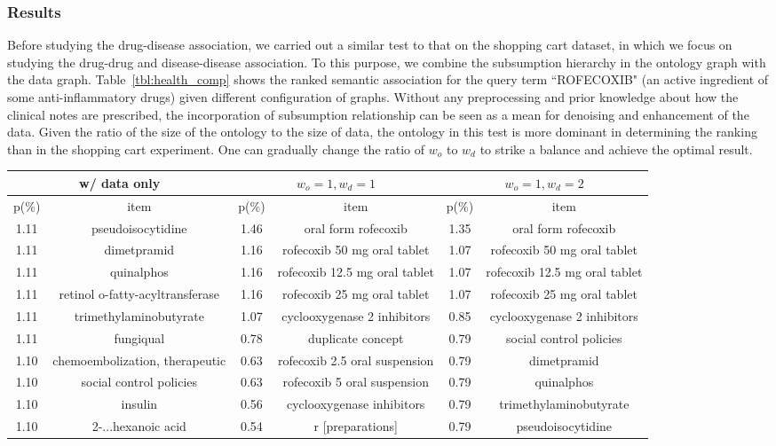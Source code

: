 \subsubsection{Results}
Before studying the drug-disease association, we carried out a similar test to that on the shopping cart dataset, in which we focus on studying the drug-drug and disease-disease association. To this purpose, we combine the subsumption hierarchy in the ontology graph with the data graph. Table~\ref{tbl:health_comp} shows the ranked semantic association for the query term ``ROFECOXIB" (an active ingredient of some anti-inflammatory drugs) given different configuration of graphs. Without any preprocessing and prior knowledge about how the clinical notes are prescribed, the incorporation of subsumption relationship can be seen as a mean for denoising and enhancement of the data. Given the ratio of the size of the ontology to the size of data, the ontology in this test is more dominant in determining the ranking than in the shopping cart experiment. One can gradually change the ratio of $w_o$ to $w_d$ to strike a balance and achieve the optimal result.
\begin{table*}[tbh]\scriptsize
\begin{center}
\begin{tabular}{ c  c || c  c || c  c  }
\hline
\multicolumn{2}{c||}{w/ data only}			&	\multicolumn{2}{c||}{$w_o=1, w_d=1$}			&	\multicolumn{2}{c}{$w_o=1, w_d=2$}		 \\
\hline
p(\%)	&	item	&	p(\%)	&	item	&	p(\%)	&	item	\\
\hline
1.11	&	pseudoisocytidine				&	1.46	&	oral form rofecoxib				&	1.35	&	oral form rofecoxib	\\
1.11	&	dimetpramid						&	1.16	&	rofecoxib 50 mg oral tablet		&	1.07	&	rofecoxib 50 mg oral tablet	\\
1.11	&	quinalphos						&	1.16	&	rofecoxib 12.5 mg oral tablet	&	1.07	&	rofecoxib 12.5 mg oral tablet	\\
1.11	&	retinol o-fatty-acyltransferase	&	1.16	&	rofecoxib 25 mg oral tablet		&	1.07	&	rofecoxib 25 mg oral tablet	 \\
1.11	&	trimethylaminobutyrate			&	1.07	&	cyclooxygenase 2 inhibitors		&	0.85	&	cyclooxygenase 2 inhibitors	\\
1.11	&	fungiqual						&	0.78	&	duplicate concept				&	0.79	&	social control policies	 \\
1.10	&	chemoembolization, therapeutic	&	0.63	&	rofecoxib 2.5 oral suspension	&	0.79	&	dimetpramid	\\
1.10	&	social control policies			&	0.63	&	rofecoxib 5 oral suspension		&	0.79	&	quinalphos	\\
1.10	&	insulin							&	0.56	&	cyclooxygenase inhibitors		&	0.79	&	trimethylaminobutyrate	 \\
1.10	&	2-...hexanoic acid				&	0.54	&	r [preparations]				&	0.79	&	pseudoisocytidine	\\
\hline
\end{tabular}
\end{center}
\caption[Top results on the electronic health dataset.]{\label{tbl:health_comp}Results of Health items ranked by the strength of semantic association.}
\end{table*}

